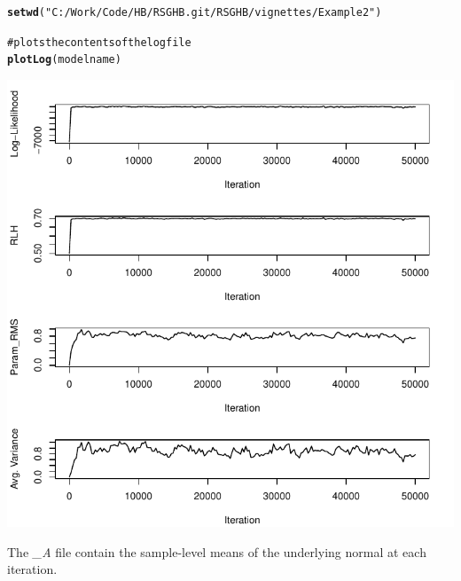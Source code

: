 \documentclass{article}\usepackage{graphicx, color}
\makeatletter
\def\maxwidth{ %
  \ifdim\Gin@nat@width>\linewidth
    \linewidth
  \else
    \Gin@nat@width
  \fi
}
\newcommand{\hlfunctioncall}[1]{\textcolor[rgb]{0.501960784313725,0,0.329411764705882}{\textbf{#1}}}%
\newcommand{\hlstring}[1]{\textcolor[rgb]{0.6,0.6,1}{#1}}%
\newcommand{\hlcomment}[1]{\textcolor[rgb]{0.180392156862745,0.6,0.341176470588235}{#1}}%
\newenvironment{kframe}{%
 \def\at@end@of@kframe{}%
 \ifinner\ifhmode%
  \def\at@end@of@kframe{\end{minipage}}%
  \begin{minipage}{\columnwidth}%
 \fi\fi%
 \def\FrameCommand##1{\hskip\@totalleftmargin \hskip-\fboxsep
 \colorbox{shadecolor}{##1}\hskip-\fboxsep
     \hskip-\linewidth \hskip-\@totalleftmargin \hskip\columnwidth}%
 \MakeFramed {\advance\hsize-\width
   \@totalleftmargin\z@ \linewidth\hsize
   \@setminipage}}%
 {\par\unskip\endMakeFramed%
 \at@end@of@kframe}
\newenvironment{knitrout}{}{} %
\makeatother
\begin{document}
\begin{knitrout}
\color{fgcolor}\begin{kframe}
\begin{alltt}

\hlfunctioncall{setwd}(\hlstring{"C:/Work/Code/HB/RSGHB.git/RSGHB/vignettes/Example2"})

\hlcomment{# plots the contents of the log file}
\hlfunctioncall{plotLog}(modelname)
\end{alltt}
\end{kframe}
\includegraphics[width=\maxwidth]{figure/unnamed-chunk-9} 

\end{knitrout}


The \emph{\_A} file contain the sample-level means of the underlying normal at each iteration.
\end{document}
